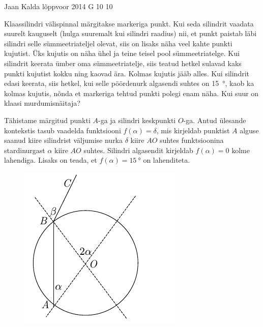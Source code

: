 {Jaan Kalda} %
{lõppvoor} %
{2014} %
{G 10} %
{10} %
{
\ifStatement
Klaassilindri välispinnal märgitakse markeriga punkt. Kui seda silindrit vaadata suurelt kauguselt (hulga suuremalt kui silindri raadius) nii, et punkt paistab läbi silindri selle sümmeetriateljel olevat, siis on lisaks näha veel kahte punkti kujutist. Üks kujutis on näha ühel ja teine teisel pool sümmeetriatelge. Kui silindrit keerata ümber oma sümmeetriatelje, siis teatud hetkel sulavad kaks punkti kujutist kokku ning kaovad ära. Kolmas kujutis jääb alles. Kui silindrit edasi keerata, siis hetkel, kui selle pöördenurk algasendi suhtes on \SI{15}{\degree}, kaob ka kolmas kujutis, nõnda et markeriga tehtud punkti polegi enam näha. Kui suur on klaasi murdumisnäitaja?
\fi


\ifHint
Tähistame märgitud punkti $A$-ga ja silindri keskpunkti $O$-ga.  Antud ülesande kontekstis tasub vaadelda funktsiooni $f(\alpha) = \delta$, mis kirjeldab punktist $A$ alguse saanud kiire silindrist väljumise nurka $\delta$ kiire $AO$ suhtes funktsioonina stardinurgast $\alpha$ kiire $AO$ suhtes. Silindri algasendit kirjeldab $f(\alpha) = 0$ kolme lahendiga. Lisaks on teada, et $f(\alpha) = \SI{15}{\degree}$ on lahenditeta.
\fi


\ifSolution
\begin{figure}%
\includegraphics[trim = 0mm 0mm 12mm 0mm, clip, width=1\linewidth]{2014-v3g-10-silinder}
\end{figure}

}
